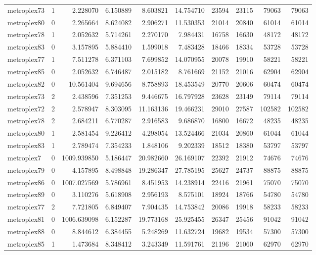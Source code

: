 \begin{longtable}{|l|r|r|r|r|r|r|r|r|r|}
metroplex73 & 1 & 2.228070 & 6.150889 & 8.603821 & 14.754710 & 23594 & 23115 & 79063 & 79063 \\
metroplex80 & 0 & 2.265664 & 8.624082 & 2.906271 & 11.530353 & 21014 & 20840 & 61014 & 61014 \\
metroplex78 & 1 & 2.052632 & 5.714261 & 2.270170 & 7.984431 & 16758 & 16630 & 48172 & 48172 \\
metroplex83 & 0 & 3.157895 & 5.884410 & 1.599018 & 7.483428 & 18466 & 18334 & 53728 & 53728 \\
metroplex77 & 1 & 7.511278 & 6.371103 & 7.699852 & 14.070955 & 20078 & 19910 & 58221 & 58221 \\
metroplex85 & 0 & 2.052632 & 6.746487 & 2.015182 & 8.761669 & 21152 & 21016 & 62904 & 62904 \\
metroplex82 & 0 & 10.561404 & 9.694656 & 8.758893 & 18.453549 & 20770 & 20606 & 60474 & 60474 \\
metroplex73 & 2 & 2.438596 & 7.351253 & 9.446675 & 16.797928 & 23628 & 23149 & 79114 & 79114 \\
metroplex72 & 2 & 2.578947 & 8.303095 & 11.163136 & 19.466231 & 29010 & 27587 & 102582 & 102582 \\
metroplex78 & 2 & 2.684211 & 6.770287 & 2.916583 & 9.686870 & 16800 & 16672 & 48235 & 48235 \\
metroplex80 & 1 & 2.581454 & 9.226412 & 4.298054 & 13.524466 & 21034 & 20860 & 61044 & 61044 \\
metroplex83 & 1 & 2.789474 & 7.354233 & 1.848106 & 9.202339 & 18512 & 18380 & 53797 & 53797 \\
metroplex7 & 0 & 1009.939850 & 5.186447 & 20.982660 & 26.169107 & 22392 & 21912 & 74676 & 74676 \\
metroplex79 & 0 & 4.157895 & 8.498848 & 19.286347 & 27.785195 & 25627 & 24737 & 88875 & 88875 \\
metroplex86 & 0 & 1007.027569 & 5.786961 & 8.451953 & 14.238914 & 22416 & 21961 & 75070 & 75070 \\
metroplex89 & 0 & 3.110276 & 5.618908 & 2.956193 & 8.575101 & 18924 & 18766 & 54780 & 54780 \\
metroplex77 & 2 & 7.721805 & 6.849407 & 7.904435 & 14.753842 & 20086 & 19918 & 58233 & 58233 \\
metroplex81 & 0 & 1006.639098 & 6.152287 & 19.773168 & 25.925455 & 26347 & 25456 & 91042 & 91042 \\
metroplex88 & 0 & 8.844612 & 6.384455 & 5.248269 & 11.632724 & 19682 & 19534 & 57300 & 57300 \\
metroplex85 & 1 & 1.473684 & 8.348412 & 3.243349 & 11.591761 & 21196 & 21060 & 62970 & 62970 \\

\end{longtable}
